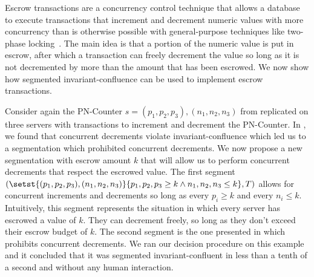 Escrow transactions are a concurrency control technique that allows a database
to execute transactions that increment and decrement numeric values with more
concurrency than is otherwise possible with general-purpose techniques like
two-phase locking~\cite{o1986escrow}. The main idea is that a portion of the
numeric value is put in escrow, after which a transaction can freely decrement
the value so long as it is not decremented by more than the amount that has
been escrowed. We now show how segmented invariant-confluence can be used to
implement escrow transactions.

Consider again the PN-Counter $s = (p_1, p_2, p_3), (n_1, n_2, n_3)$ from
 replicated on three servers with transactions
to increment and decrement the PN-Counter. In
, we found that concurrent decrements violate
invariant-confluence which led us to a segmentation which prohibited concurrent
decrements. We now propose a new segmentation with escrow amount $k$ that will
allow us to perform concurrent decrements that respect the escrowed value. The
first segment $(\setst{(p_1, p_2, p_3), (n_1, n_2, n_3)}{p_1, p_2, p_3 \geq k
\land n_1, n_2, n_3 \leq k}, T)$ allows for concurrent increments and
decrements so long as every $p_i \geq k$ and every $n_i \leq k$. Intuitively,
this segment represents the situation in which every server has escrowed a
value of $k$. They can decrement freely, so long as they don't exceed their
escrow budget of $k$. The second segment is the one presented in
 which prohibits concurrent decrements. We ran
our decision procedure on this example and it concluded that it was segmented
invariant-confluent in less than a tenth of a second and without any human
interaction.

